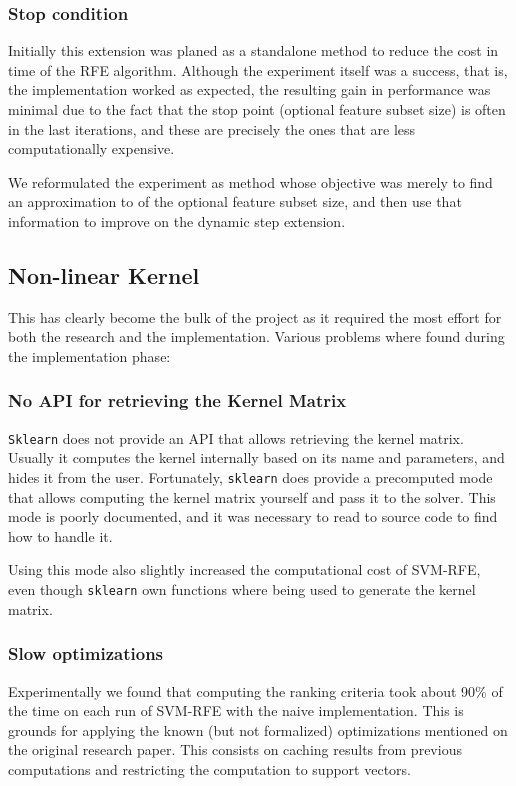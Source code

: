 \subsubsection*{Stop condition}

Initially this extension was planed as a standalone method to reduce the cost in time of the RFE algorithm. Although the experiment itself was a success, that is, the implementation worked as expected, the resulting gain in performance was minimal due to the fact that the stop point (optional feature subset size) is often in the last iterations, and these are precisely the ones that are less computationally expensive.

We reformulated the experiment as method whose objective was merely to find an approximation to of the optional feature subset size, and then use that in\-for\-ma\-tion to improve on the dynamic step extension.

\subsection{Non-linear Kernel}

This has clearly become the bulk of the project as it required the most effort for both the research and the implementation. Various problems where found during the implementation phase:

\subsubsection*{No API for retrieving the Kernel Matrix}
\texttt{Sklearn} does not provide an API that allows retrieving the kernel matrix. Usually it computes the kernel internally based on its name and parameters, and hides it from the user. Fortunately, \texttt{sklearn} does provide a precomputed mode that allows computing the kernel matrix yourself and pass it to the solver. This mode is poorly documented, and it was necessary to read to source code to find how to handle it.

Using this mode also slightly increased the computational cost of SVM-RFE, even though \texttt{sklearn} own functions where being used to generate the kernel matrix.

\subsubsection*{Slow optimizations}
Experimentally we found that computing the ranking criteria took about 90\% of the time on each run of SVM-RFE with the naive implement\-ation. This is grounds for applying the known (but not formalized) optimizations mentioned on the original research paper. This consists on caching results from previous computations and restricting the comput\-ation to support vectors.

